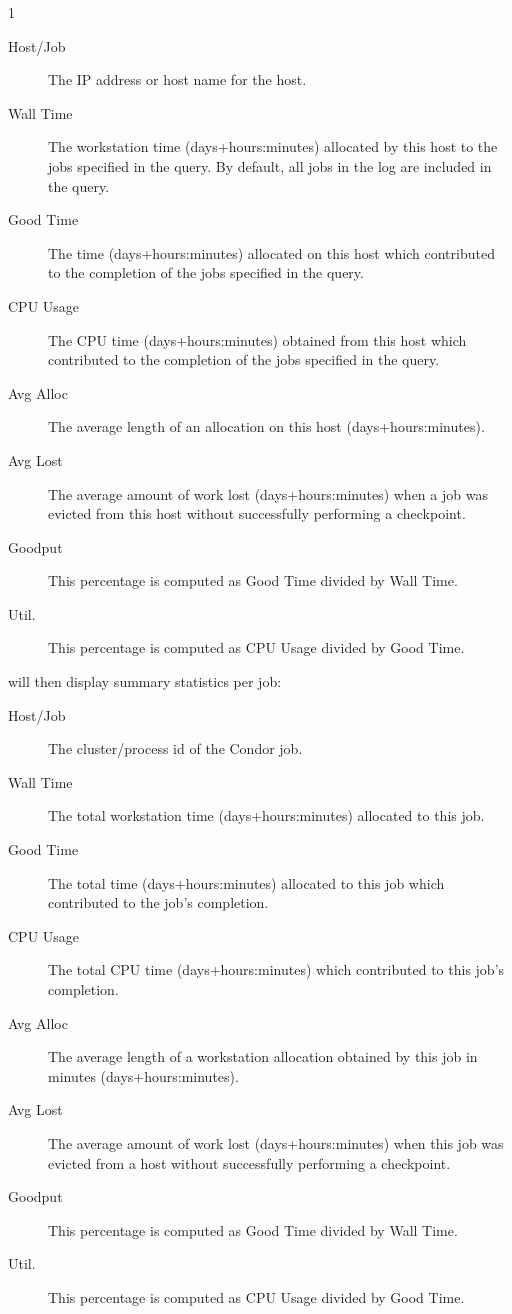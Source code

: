 \begin{ManPage}{\label{man-condor-userlog}}{1}
\begin{description}
\item[Host/Job] The IP address or host name for the host.
\item[Wall Time] The workstation time (days+hours:minutes) allocated by
this host to the jobs specified in the query.  By default, all jobs in
the log are included in the query.
\item[Good Time] The time (days+hours:minutes) allocated on this host which
contributed to the completion of the jobs specified in the query.
\item[CPU Usage] The CPU time (days+hours:minutes) obtained from this
host which
contributed to the completion of the jobs specified in the query.
\item[Avg Alloc] The average length of an allocation on this host
(days+hours:minutes).
\item[Avg Lost] The average amount of work lost (days+hours:minutes) when a job
was evicted from this host without successfully performing a checkpoint.
\item[Goodput] This percentage is computed as Good Time divided by
Wall Time.
\item[Util.] This percentage is computed as CPU Usage divided by Good
Time.
\end{description}

 will then display summary statistics per job:

\begin{description}
\item[Host/Job] The cluster/process id of the Condor job.
\item[Wall Time] The total workstation time (days+hours:minutes) allocated to
this job.
\item[Good Time] The total time (days+hours:minutes) allocated to this
job which 
contributed to the job's completion.
\item[CPU Usage] The total CPU time (days+hours:minutes) which
contributed to this 
job's completion.
\item[Avg Alloc] The average length of a workstation allocation
obtained by this job in minutes (days+hours:minutes).
\item[Avg Lost] The average amount of work lost (days+hours:minutes)
when this job 
was evicted from a host without successfully performing a checkpoint.
\item[Goodput] This percentage is computed as Good Time divided by
Wall Time.
\item[Util.] This percentage is computed as CPU Usage divided by Good
Time.
\end{description}


\end{ManPage}
